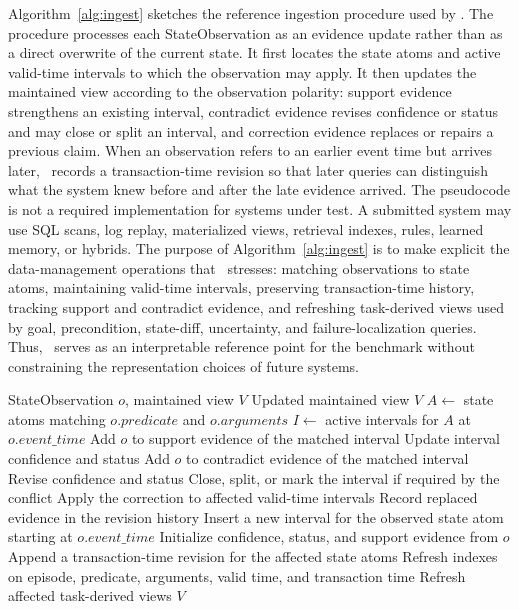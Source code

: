 Algorithm~\ref{alg:ingest} sketches the reference ingestion procedure used by \engine. The procedure processes each StateObservation as an evidence update rather than as a direct overwrite of the current state. It first locates the state atoms and active valid-time intervals to which the observation may apply. It then updates the maintained view according to the observation polarity: support evidence strengthens an existing interval, contradict evidence revises confidence or status and may close or split an interval, and correction evidence replaces or repairs a previous claim. When an observation refers to an earlier event time but arrives later, \engine\ records a transaction-time revision so that later queries can distinguish what the system knew before and after the late evidence arrived.
The pseudocode is not a required implementation for systems under test. A submitted system may use SQL scans, log replay, materialized views, retrieval indexes, rules, learned memory, or hybrids. The purpose of Algorithm~\ref{alg:ingest} is to make explicit the data-management operations that \bench\ stresses: matching observations to state atoms, maintaining valid-time intervals, preserving transaction-time history, tracking support and contradict evidence, and refreshing task-derived views used by goal, precondition, state-diff, uncertainty, and failure-localization queries. Thus, \engine\ serves as an interpretable reference point for the benchmark without constraining the representation choices of future systems.



\begin{algorithm}[!t]
\caption{Reference ingestion procedure in \engine.}
\label{alg:ingest}
\footnotesize
\begin{algorithmic}[1]
\REQUIRE StateObservation $o$, maintained view $V$
\ENSURE Updated maintained view $V$
\STATE $A \leftarrow$ state atoms matching $o.predicate$ and $o.arguments$
\STATE $I \leftarrow$ active intervals for $A$ at $o.event\_time$
    \STATE Add $o$ to support evidence of the matched interval
    \STATE Update interval confidence and status
    \STATE Add $o$ to contradict evidence of the matched interval
    \STATE Revise confidence and status
    \STATE Close, split, or mark the interval if required by the conflict
    \STATE Apply the correction to affected valid-time intervals
    \STATE Record replaced evidence in the revision history
\ELSE
    \STATE Insert a new interval for the observed state atom starting at $o.event\_time$
    \STATE Initialize confidence, status, and support evidence from $o$
\ENDIF
{}
    \STATE Append a transaction-time revision for the affected state atoms
\ENDIF
\STATE Refresh indexes on episode, predicate, arguments, valid time, and transaction time
\STATE Refresh affected task-derived views
\RETURN $V$
\end{algorithmic}
\end{algorithm}



